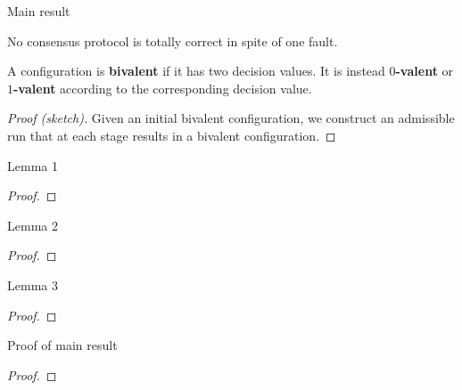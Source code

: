 \documentclass[12pt]{beamer}
\begin{document}
  \begin{frame}{Main result}
    \begin{theorem}
      No consensus protocol is totally correct in spite of one fault.
    \end{theorem}

    \vspace{0.25cm}

    A configuration is \textbf{bivalent} if it has two decision values. It is instead \textbf{\(0\)-valent} or \textbf{\(1\)-valent} according to the corresponding decision value.

    \vspace{0.25cm}

    \begin{proof}[Proof (sketch)]
      Given an initial bivalent configuration, we construct an admissible run that at each stage results in a bivalent configuration.
    \end{proof}
  \end{frame}

  \begin{frame}{Lemma 1}
    \begin{lemma}
    \end{lemma}
    \begin{proof}
    \end{proof}
  \end{frame}

  \begin{frame}{Lemma 2}
    \begin{lemma}
    \end{lemma}
    \begin{proof}
    \end{proof}
  \end{frame}

  \begin{frame}{Lemma 3}
    \begin{lemma}
    \end{lemma}
    \begin{proof}
    \end{proof}
  \end{frame}

  \begin{frame}{Proof of main result}
    \begin{proof}
    \end{proof}
  \end{frame}
\end{document}
